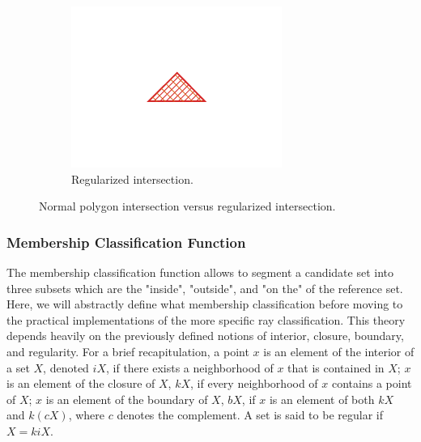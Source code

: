 \documentclass[a4paper,11pt,oneside]{article}
\begin{document}
\begin{figure}[ht]
\begin{subfigure}[b]{0.3\textwidth}
     \end{subfigure}
     \hfill
     \begin{subfigure}[b]{0.3\textwidth}
         \centering
         \includegraphics[width=\textwidth]{section3/3.2/regularization-regular.png}
         \caption{Regularized intersection.}
         \label{sec3.2:regular-intersection}
     \end{subfigure}
        \caption{Normal polygon intersection versus regularized intersection.}
        \label{sec3.2:regularity}
\end{figure}
   
\subsubsection{Membership Classification Function}
The membership classification function allows to segment a candidate set into three subsets which are the "inside", "outside", and "on the" of the reference set. Here, we will abstractly define what membership classification before moving to the practical implementations of the more specific ray classification.
This theory depends heavily on the previously defined notions of interior, closure, boundary, and regularity. For a brief recapitulation, a point $x$ is an element of the interior of a set $X$, denoted $iX$, if there exists a neighborhood of $x$ that is contained in $X$; $x$ is an element of the closure of $X$, $kX$, if every neighborhood of $x$ contains a point of $X$; $x$ is an element of the boundary of $X$, $bX$, if $x$ is an element of both $kX$ and $k(cX)$, where $c$ denotes the complement. A set is said to be regular if $X = kiX$.
\end{document}
